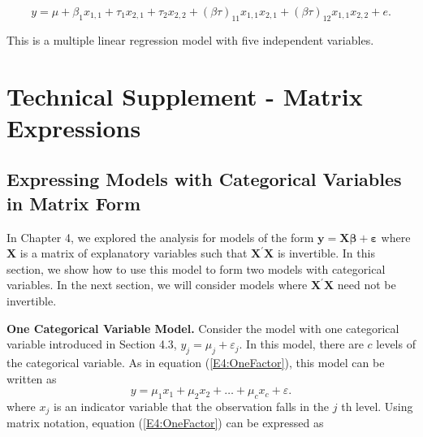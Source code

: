 \begin{equation*}
y=\mu +\beta_1x_{1,1}+\tau_1x_{2,1}+\tau_2x_{2,2}+(\beta \tau
)_{11}x_{1,1}x_{2,1}+(\beta \tau )_{12}x_{1,1}x_{2,2}+e.
\end{equation*}

\noindent This is a multiple linear regression model with five
independent variables.


\section{Technical Supplement - Matrix Expressions}

\subsection{Expressing Models with Categorical Variables in
Matrix Form}

In Chapter 4, we explored the analysis for models of the form
$\mathbf{y=X}  \boldsymbol \beta + \boldsymbol \varepsilon$ where
$\mathbf{X}$ is a matrix of explanatory variables such that
$\mathbf{X}^{\prime }\mathbf{X}$ is invertible. In this section, we
show how to use this model to form two models with categorical
variables. In the next section, we will consider models where
$\mathbf{X}^{\prime }\mathbf{X}$ need not be invertible.

\textbf{One Categorical Variable Model.} Consider the model with one
categorical variable introduced in Section 4.3, $y_{j}=\mu_{j} +
\varepsilon_{j}.$ In this model, there are $c$ levels of the
categorical variable. As in equation (\ref{E4:OneFactor}), this
model can be written as
\begin{equation*}
y=\mu_1x_1+\mu_2x_2+\ldots +\mu_cx_{c}+\varepsilon.
\end{equation*}
where $x_{j}$ is an indicator variable that the observation falls in the $j$%
th level. Using matrix notation, equation (\ref{E4:OneFactor}) can
be expressed as

